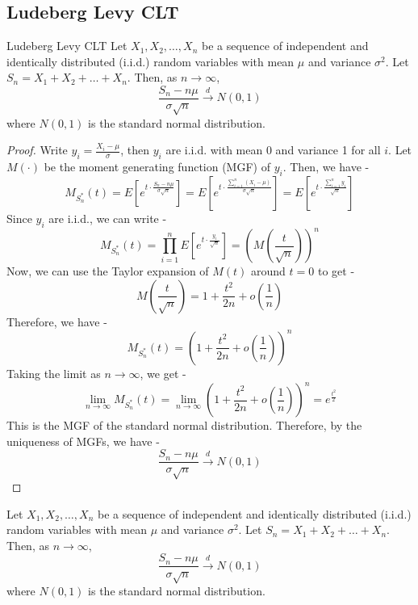 \documentclass[openany]{book}
\begin{document}
\subsection{Ludeberg Levy CLT}
\begin{mytheorem}{Ludeberg Levy CLT}
    Let \( X_1, X_2, \ldots, X_n \) be a sequence of independent and identically distributed (i.i.d.) random variables with mean \( \mu \) and variance \( \sigma^2 \). Let \( S_n = X_1 + X_2 + \ldots + X_n \). Then, as \( n \to \infty \),
    \[
        \frac{S_n - n\mu}{\sigma\sqrt{n}} \xrightarrow{d} N(0, 1)
    \]
    where \( N(0, 1) \) is the standard normal distribution.
\end{mytheorem}
\begin{proof}
    Write $y_i = \frac{X_i - \mu}{\sigma}$, then $y_i$ are i.i.d. with mean 0 and variance 1 for all $i$. Let $M(\cdot)$ be the moment generating function (MGF) of $y_i$. Then, we have -
    $$M_{S_n^*}(t) = E[e^{t \cdot \frac{S_n - n\mu}{\sigma\sqrt{n}}}] = E[e^{t \cdot \frac{\sum_{i=1}^{n} (X_i - \mu)}{\sigma\sqrt{n}}}] = E[e^{t \cdot \frac{\sum_{i=1}^{n} y_i}{\sqrt{n}}}]$$
    Since $y_i$ are i.i.d., we can write -
    $$M_{S_n^*}(t) = \prod_{i=1}^{n} E[e^{t \cdot \frac{y_i}{\sqrt{n}}}] = \left( M\left( \frac{t}{\sqrt{n}} \right) \right)^n$$
    Now, we can use the Taylor expansion of $M(t)$ around $t=0$ to get -
    $$M\left( \frac{t}{\sqrt{n}} \right) = 1 + \frac{t^2}{2n} + o\left( \frac{1}{n} \right)$$
    Therefore, we have -
    $$M_{S_n^*}(t) = \left( 1 + \frac{t^2}{2n} + o\left( \frac{1}{n} \right) \right)^n$$
    Taking the limit as $n \to \infty$, we get -
    $$\lim_{n \to \infty} M_{S_n^*}(t) = \lim_{n \to \infty} \left( 1 + \frac{t^2}{2n} + o\left( \frac{1}{n} \right) \right)^n = e^{\frac{t^2}{2}}$$
    This is the MGF of the standard normal distribution. Therefore, by the uniqueness of MGFs, we have -
    $$\frac{S_n - n\mu}{\sigma\sqrt{n}} \xrightarrow{d} N(0, 1)$$
\end{proof}
\begin{mytheorem}
    Let \( X_1, X_2, \ldots, X_n \) be a sequence of independent and identically distributed (i.i.d.) random variables with mean \( \mu \) and variance \( \sigma^2 \). Let \( S_n = X_1 + X_2 + \ldots + X_n \). Then, as \( n \to \infty \),
    \[
        \frac{S_n - n\mu}{\sigma\sqrt{n}} \xrightarrow{d} N(0, 1)
    \]
    where \( N(0, 1) \) is the standard normal distribution.
\end{mytheorem}
\end{document}
